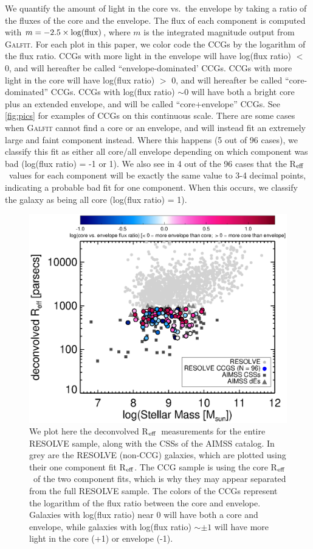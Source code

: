\documentclass[iop,apj]{emulateapj}
\newcommand{\Reff}{R$_{\rm eff}$}
\begin{document}
We quantify the amount of light in the core vs.~the envelope by taking a ratio of the fluxes of the core and the envelope. The flux of each component is computed with $m = -2.5 \times \log({\rm flux})$, where $m$ is the integrated magnitude output from \textsc{Galfit}. For each plot in this paper, we color code the CCGs by the logarithm of the flux ratio. CCGs with more light in the envelope will have log(flux ratio) $<$ 0, and will hereafter be called ``envelope-dominated' CCGs. CCGs with more light in the core will have log(flux ratio) $>$ 0, and will hereafter be called ``core-dominated'' CCGs. CCGs with log(flux ratio) $\sim 0$ will have both a bright core plus an extended envelope, and will be called ``core+envelope'' CCGs. See \autoref{fig:pics} for examples of CCGs on this continuous scale. There are some cases when \textsc{Galfit} cannot find a core or an envelope, and will instead fit an extremely large and faint component instead. Where this happens (5 out of 96 cases), we classify this fit as either all core/all envelope depending on which component was bad (log(flux ratio) = -1 or 1). We also see in 4 out of the 96 cases that the \Reff\ values for each component will be exactly the same value to 3-4 decimal points, indicating a probable bad fit for one component. When this occurs, we classify the galaxy as being all core (log(flux ratio) = 1).

\begin{figure}[hbpt!]
\begin{center}
\includegraphics{Reff_Mstars.eps}
\caption{We plot here the deconvolved \Reff\ measurements for the entire RESOLVE sample, along with the CSSs of the AIMSS catalog. In grey are the RESOLVE (non-CCG) galaxies, which are plotted using their one component fit \Reff. The CCG sample is using the core \Reff\ of the two component fits, which is why they may appear separated from the full RESOLVE sample. The colors of the CCGs represent the logarithm of the flux ratio between the core and envelope. Galaxies with log(flux ratio) near 0 will have both a core and envelope, while galaxies with log(flux ratio) $\sim \pm 1$ will have more light in the core (+1) or envelope (-1).}
\label{fig:radius}
\end{center}
\end{figure}
\end{document}
